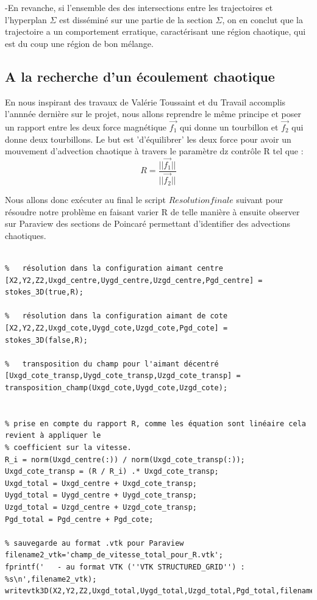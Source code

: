 \documentclass[a4paper,12pt,titlepage]{report}
\begin{document}
\begin{onehalfspace}
-En revanche, si l'ensemble des des intersections entre les trajectoires et l'hyperplan $\Sigma$ est disséminé sur une partie de la section $\Sigma$, on en conclut que la trajectoire a un comportement erratique, caractérisant une région chaotique, qui est du coup une région de bon mélange. 

\subsection{A la recherche d'un écoulement chaotique}

En nous inspirant des travaux de Valérie Toussaint et du Travail accomplis l'annnée dernière sur le projet, nous allons reprendre le même principe et poser un rapport entre les deux force magnétique $\vec{f_1}$ qui donne un tourbillon et $\vec{f_2}$ qui donne deux tourbillons. Le but est 'd'équilibrer' les deux force pour avoir un mouvement d'advection chaotique à travers le paramètre dz contrôle R tel que :
\[ R = \frac{||\vec{f_1}||}{||\vec{f_2}||} \]

Nous allons donc exécuter au final le script $Resolution finale$ suivant pour résoudre notre problème en faisant varier R de telle manière à ensuite observer sur Paraview des sections de Poincaré permettant d'identifier des advections chaotiques.

\begin{verbatim}

%   résolution dans la configuration aimant centre
[X2,Y2,Z2,Uxgd_centre,Uygd_centre,Uzgd_centre,Pgd_centre] = stokes_3D(true,R);

%   résolution dans la configuration aimant de cote
[X2,Y2,Z2,Uxgd_cote,Uygd_cote,Uzgd_cote,Pgd_cote] = stokes_3D(false,R);

%   transposition du champ pour l'aimant décentré
[Uxgd_cote_transp,Uygd_cote_transp,Uzgd_cote_transp] = transposition_champ(Uxgd_cote,Uygd_cote,Uzgd_cote);


% prise en compte du rapport R, comme les équation sont linéaire cela revient à appliquer le 
% coefficient sur la vitesse.
R_i = norm(Uxgd_centre(:)) / norm(Uxgd_cote_transp(:));
Uxgd_cote_transp = (R / R_i) .* Uxgd_cote_transp;
Uxgd_total = Uxgd_centre + Uxgd_cote_transp;
Uygd_total = Uygd_centre + Uygd_cote_transp;
Uzgd_total = Uzgd_centre + Uzgd_cote_transp;
Pgd_total = Pgd_centre + Pgd_cote;

% sauvegarde au format .vtk pour Paraview
filename2_vtk='champ_de_vitesse_total_pour_R.vtk';
fprintf('   - au format VTK (''VTK STRUCTURED_GRID'') : %s\n',filename2_vtk);
writevtk3D(X2,Y2,Z2,Uxgd_total,Uygd_total,Uzgd_total,Pgd_total,filename2_vtk);
\end{verbatim}


\end{onehalfspace}
\end{document}
